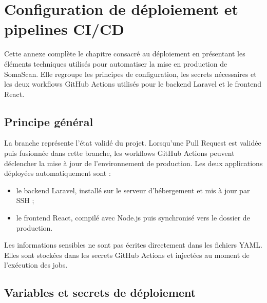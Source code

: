 \chapter{Configuration de déploiement et pipelines CI/CD}

Cette annexe complète le chapitre consacré au déploiement en présentant les éléments techniques utilisés pour automatiser la mise en production de SomaScan. Elle regroupe les principes de configuration, les secrets nécessaires et les deux workflows GitHub Actions utilisés pour le backend Laravel et le frontend React.

\section{Principe général}

La branche  représente l'état validé du projet. Lorsqu'une Pull Request est validée puis fusionnée dans cette branche, les workflows GitHub Actions peuvent déclencher la mise à jour de l'environnement de production. Les deux applications déployées automatiquement sont :

\begin{itemize}
    \item le backend Laravel, installé sur le serveur d'hébergement et mis à jour par SSH ;
    \item le frontend React, compilé avec Node.js puis synchronisé vers le dossier de production.
\end{itemize}

Les informations sensibles ne sont pas écrites directement dans les fichiers YAML. Elles sont stockées dans les secrets GitHub Actions et injectées au moment de l'exécution des jobs.

\section{Variables et secrets de déploiement}

